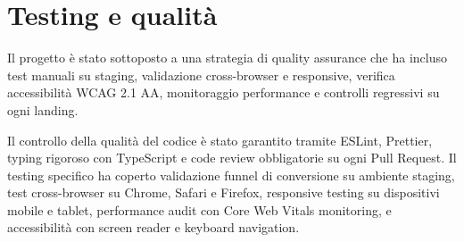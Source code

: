 \section{Testing e qualità}
Il progetto è stato sottoposto a una strategia di quality assurance che ha
incluso test manuali su staging, validazione cross-browser e responsive,
verifica accessibilità WCAG 2.1 AA, monitoraggio performance e controlli 
regressivi su ogni landing.

Il controllo della qualità del codice è stato garantito tramite ESLint, Prettier, 
typing rigoroso con TypeScript e code review obbligatorie su ogni Pull Request.
Il testing specifico ha coperto validazione funnel di conversione su ambiente 
staging, test cross-browser su Chrome, Safari e Firefox, responsive testing 
su dispositivi mobile e tablet, performance audit con Core Web Vitals monitoring, 
e accessibilità con screen reader e keyboard navigation.
